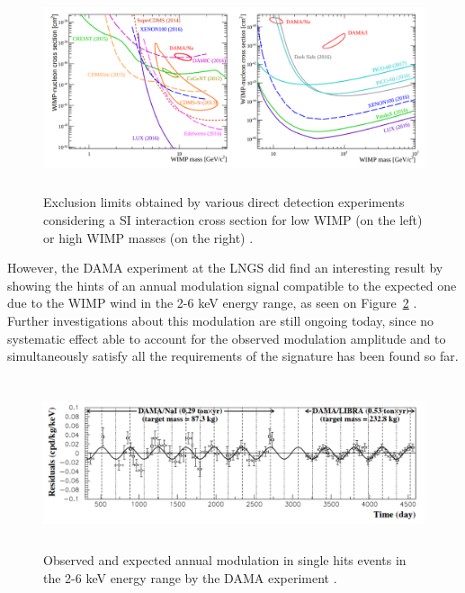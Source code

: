 \documentclass[a4paper, 10pt, openright]{report}
\begin{document}
\begin{figure}[htbp]
\begin{center}
\includegraphics[width=14cm, height=6cm]{figs/DirectLimits.png}
\caption{Exclusion limits obtained by various direct detection experiments considering a \ac{SI} interaction cross section for low \ac{WIMP} (on the left) or high \ac{WIMP} masses (on the right) \cite{DirectWays}.}
\label{fig:DirectLimits}
\end{center}
\end{figure}

However, the DAMA experiment at the \ac{LNGS} did find an interesting result by showing the hints of an annual modulation signal compatible to the expected one due to the \ac{WIMP} wind in the 2-6 keV energy range, as seen on Figure~\ref{fig:DAMA} \cite{DAMA}. Further investigations about this modulation are still ongoing today, since no systematic effect able to account for the observed modulation amplitude and to simultaneously satisfy all the requirements of the signature has been found so far.

\begin{figure}[htbp]
\begin{center}
\includegraphics[width=14cm, height=5cm]{figs/DAMA.png}
\caption{Observed and expected annual modulation in single hits events in the 2-6 keV energy range by the DAMA experiment \cite{DAMA}.}
\label{fig:DAMA}
\end{center}
\end{figure}
\end{document}

